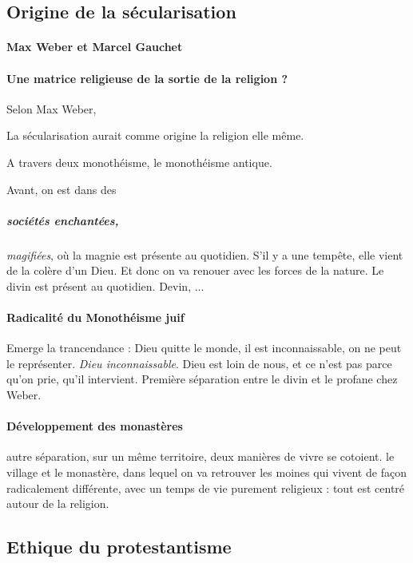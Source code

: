 \subsection{Origine de la sécularisation}

\paragraph{Max Weber et Marcel Gauchet}  


\paragraph{Une matrice religieuse de la sortie de la religion ?}
Selon Max Weber,  
\begin{Synthesis}
La sécularisation aurait comme origine la religion elle même. 
\end{Synthesis}
A travers deux monothéisme, le monothéisme antique. 

Avant, on est dans des \subparagraph{sociétés enchantées,} \textit{magifiées}, où la magnie est présente au quotidien. S'il y a une tempête, elle vient de la colère d'un Dieu. Et donc on va renouer avec les forces de la nature. Le divin est présent au quotidien. Devin, ...

\paragraph{Radicalité du Monothéisme juif} Emerge la trancendance : Dieu quitte le monde, il est inconnaissable, on ne peut le représenter. \textit{Dieu inconnaissable}. Dieu est loin de nous, et ce n'est pas parce qu'on prie, qu'il intervient. 
Première séparation entre le divin et le profane chez Weber. 

\paragraph{Développement des monastères} autre séparation, sur un même territoire, deux manières de vivre se cotoient. le village et le monastère, dans lequel on va retrouver les moines qui vivent de façon radicalement différente, avec un temps de vie purement religieux : tout est centré autour de la religion. 

\subsection{Ethique du protestantisme}

